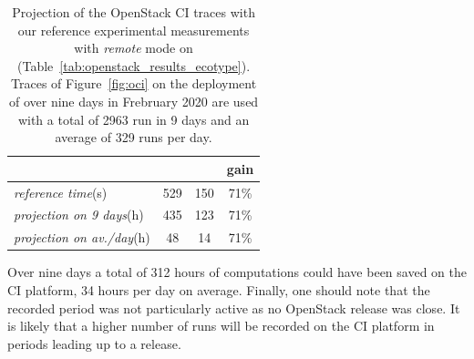 \begin{table}
\begin{center}
	\begin{tabular}{lccc}
		\toprule
		& \kolla & \mad & gain\\
		\midrule
		\emph{reference time}(s) & 529 & 150 & 71\%\\
		\emph{projection on 9 days}(h) & 435 & 123 & 71\%\\
		\emph{projection on av./day}(h) & 48 & 14 & 71\%\\
		\bottomrule
	\end{tabular}
	\caption{Projection of the OpenStack CI traces with our reference experimental 
			measurements with \emph{remote} mode on \ecotype 		
			(Table~\ref{tab:openstack_results_ecotype}). Traces of 			
			Figure~\ref{fig:oci} on the deployment of \kolla over nine days in 
			Frebruary 2020 are used with a total of 2963 \kolla run in 9 days and 
			an average of 329 runs per day.}
			\label{tab:projection}
	\end{center}
\end{table}

Over nine days a total of 312 hours of computations could have been
saved on the CI platform, 34 hours per day on average.  Finally, one
should note that the recorded period was not particularly active as no
OpenStack release was close. It is likely that a higher number
of \kolla runs will be recorded on the CI platform in periods leading
up to a release.




